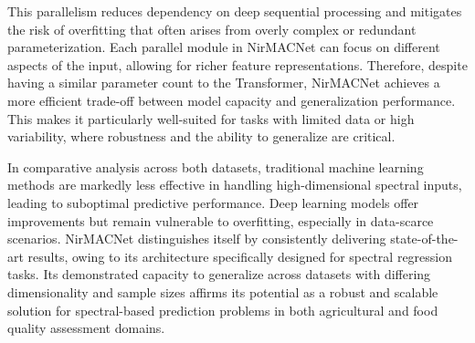 \documentclass[10pt, a4paper, oneside]{article}
\begin{document}
This parallelism reduces dependency on deep sequential processing and mitigates the risk of overfitting that often arises from overly complex or redundant parameterization. Each parallel module in NirMACNet can focus on different aspects of the input, allowing for richer feature representations. Therefore, despite having a similar parameter count to the Transformer, NirMACNet achieves a more efficient trade-off between model capacity and generalization performance. This makes it particularly well-suited for tasks with limited data or high variability, where robustness and the ability to generalize are critical.

In comparative analysis across both datasets, traditional machine learning methods are markedly less effective in handling high-dimensional spectral inputs, leading to suboptimal predictive performance. Deep learning models offer improvements but remain vulnerable to overfitting, especially in data-scarce scenarios. NirMACNet distinguishes itself by consistently delivering state-of-the-art results, owing to its architecture specifically designed for spectral regression tasks. Its demonstrated capacity to generalize across datasets with differing dimensionality and sample sizes affirms its potential as a robust and scalable solution for spectral-based prediction problems in both agricultural and food quality assessment domains.
\end{document}
